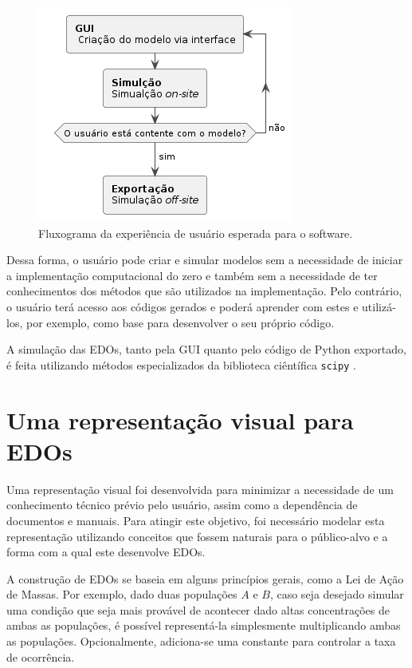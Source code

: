 \documentclass[
	12pt,				%
	openright,			%
	oneside,			%
	a4paper,			%
	main=brazil,
	english,			%
	]{ufsj-abntex2}
\begin{document}
\begin{figure}[h]
    \centering
    \includegraphics[scale=1]{diagrams/img/fluxograma-exp.png}
    \caption{Fluxograma da experiência de usuário esperada para o software.}
    \label{fig::experiencia_usuario}
\end{figure}

Dessa forma, o usuário pode criar e simular modelos sem a necessidade de iniciar a implementação computacional do zero e também sem a necessidade de ter conhecimentos dos métodos que são utilizados na implementação. Pelo contrário, o usuário terá acesso aos códigos gerados e poderá aprender com estes e utilizá-los, por exemplo, como base para desenvolver o seu próprio código. 

A simulação das EDOs, tanto pela GUI quanto pelo código de Python exportado, é feita utilizando métodos especializados da biblioteca ciêntífica \texttt{scipy} \cite{scipy}. %

\section{Uma representação visual para EDOs}
\label{sec:representacao-visual-edo}

Uma representação visual foi desenvolvida para minimizar a necessidade de um conhecimento técnico prévio pelo usuário, assim como a dependência de documentos e manuais. Para atingir este objetivo, foi necessário modelar esta representação utilizando conceitos que fossem naturais para o público-alvo e a forma com a qual este desenvolve EDOs.

A construção de EDOs se baseia em alguns princípios gerais, como a Lei de Ação de Massas. Por exemplo, dado duas populações $A$ e $B$, caso seja desejado simular uma condição que seja mais provável de acontecer dado altas concentrações de ambas as populações, é possível representá-la simplesmente multiplicando ambas as populações. Opcionalmente, adiciona-se uma constante para controlar a taxa de ocorrência.
\end{document}

